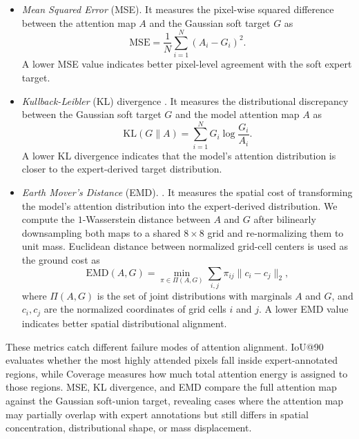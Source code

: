 \documentclass[lineno,pdflatex,sn-mathphys-num]{sn-jnl}%
\theoremstyle{thmstyleone}%
\theoremstyle{thmstyletwo}%
\theoremstyle{thmstylethree}%
\begin{document}
\begin{itemize}
\item \textit{Mean Squared Error} (MSE). It measures the pixel-wise squared difference between the attention map $A$ and the Gaussian soft target $G$ as
\begin{equation}
\mathrm{MSE} = \frac{1}{N}\sum_{i=1}^{N}\left(A_i - G_i\right)^{2}.
\end{equation}
A lower MSE value indicates better pixel-level agreement with the soft expert target.

\item \textit{Kullback-Leibler} (KL) divergence \cite{Kullback1951}. It measures the distributional discrepancy between the Gaussian soft target $G$ and the model attention map $A$ as
\begin{equation}
\mathrm{KL}(G \| A) = \sum_{i=1}^{N} G_i \log\frac{G_i}{A_i}.
\end{equation}
A lower KL divergence indicates that the model's attention distribution is closer to the expert-derived target distribution.

\item \textit{Earth Mover's Distance} (EMD). \cite{Rubner2000}. It measures the spatial cost of transforming the model's attention distribution into the expert-derived distribution. We compute the $1$-Wasserstein distance between $A$ and $G$ after bilinearly downsampling both maps to a shared $8 \times 8$ grid and re-normalizing them to unit mass. Euclidean distance between normalized grid-cell centers is used as the ground cost as
\begin{equation}
\mathrm{EMD}(A, G) = \min_{\pi \in \Pi(A, G)}\sum_{i,j} \pi_{ij} \|c_i - c_j\|_2,
\end{equation}
where $\Pi(A, G)$ is the set of joint distributions with marginals $A$ and $G$, and $c_i, c_j$ are the normalized coordinates of grid cells $i$ and $j$. A lower EMD value indicates better spatial distributional alignment.
\end{itemize}

These metrics catch different failure modes of attention alignment. IoU@90 evaluates whether the most highly attended pixels fall inside expert-annotated regions, while Coverage measures how much total attention energy is assigned to those regions. MSE, KL divergence, and EMD compare the full attention map against the Gaussian soft-union target, revealing cases where the attention map may partially overlap with expert annotations but still differs in spatial concentration, distributional shape, or mass displacement.
\end{document}
